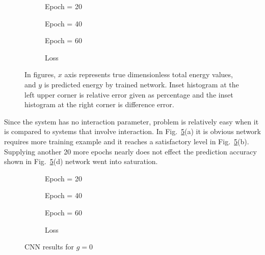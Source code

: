 \documentclass[a4paper,times,12pt]{article}
\begin{document}
\begin{figure}[H]
    \centering
    \begin{subfigure}[t]{0.45\textwidth}
        
        \caption{Epoch = 20}
		\label{fig:a}
    \end{subfigure}
    \begin{subfigure}[t]{0.45\textwidth}
        
        \caption{Epoch = 40}
		\label{fig:b}
    \end{subfigure}
    \begin{subfigure}[t]{0.45\textwidth}
        
        \caption{Epoch = 60}
		\label{fig:c}
    \end{subfigure}
    \begin{subfigure}[t]{0.45\textwidth}
        
        \caption{Loss}
		\label{fig:d}
    \end{subfigure}
    \caption{In figures, $x$ axis represents true dimensionless total energy values, and $y$ is predicted energy by trained network. Inset histogram at the left upper corner is relative error given as percentage and the inset histogram at the right corner is difference error.}
\label{fig:FFN-g-0}
\end{figure}

Since the system has no interaction parameter, problem is relatively easy when it is compared to systems that involve interaction. In Fig.~\ref{fig:FFN-g-0}(a) it is obvious network requires more training example and it reaches a satisfactory level in Fig.~\ref{fig:FFN-g-0}(b). Supplying another 20 more epochs nearly does not effect the prediction accuracy shown in Fig.~\ref{fig:FFN-g-0}(d) network went into saturation.


\begin{figure}[H]
    \centering
    \begin{subfigure}[t]{0.45\textwidth}
		\centering
        
        \caption{Epoch = 20}
		\label{fig:a}
    \end{subfigure}
    \begin{subfigure}[t]{0.45\textwidth}
		\centering
        
        \caption{Epoch = 40}
		\label{fig:b}
    \end{subfigure}    
    \begin{subfigure}[t]{0.45\textwidth}
        \centering
        
        \caption{Epoch = 60}
		\label{fig:c}
    \end{subfigure}
    \begin{subfigure}[t]{0.45\textwidth}
        \centering
        
        \caption{Loss}
		\label{fig:c}
    \end{subfigure}
    \caption{CNN results for $g = 0$}
\label{fig:CNN-g-0}
\end{figure}
\end{document}
